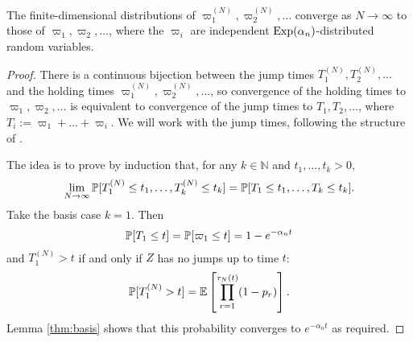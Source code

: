 \begin{lemma}\label{thm:holdingtimes_distn}
The finite-dimensional distributions of $\varpi_1^{(N)} , \varpi_2^{(N)} , \dots$ converge as $N\to\infty$ to those of $\varpi_1, \varpi_2, \dots$, where the $\varpi_i$ are independent $\operatorname{Exp}(\alpha_n)$-distributed random variables.
\end{lemma}

\begin{proof}
There is a continuous bijection between the jump times $T_1^{(N)} ,T_2^{(N)},\dots$ and the holding times $\varpi_1^{(N)}, \varpi_2^{(N)}, \dots$, so convergence of the holding times to $\varpi_1, \varpi_2,\dots$ is equivalent to convergence of the jump times to $T_1, T_2, \dots$, where $T_i := \varpi_1+\dots+\varpi_i$. 
We will work with the jump times, following the structure of \textcite[Lemma 3.2]{mohle1999}.

The idea is to prove by induction that, for any $k\in\mathbb{N}$ and $t_1,\dots,t_k >0$,
\begin{equation}\label{eq:518}
\lim_{N\to\infty} \mathbb{P}[ T_1^{(N)} \leq t_1, \dots , T_k^{(N)} \leq t_k ]
= \mathbb{P}[ T_1 \leq t_1, \dots , T_k \leq t_k ] .
\end{equation}
Take the basis case $k=1$. Then 
\begin{equation*}
\mathbb{P}[ T_1 \leq t ] 
= \mathbb{P}[ \varpi_1 \leq t ] = 1 - e^{-\alpha_n t}
\end{equation*}
and $T_1^{(N)} >t$ if and only if $Z$ has no jumps up to time $t$:
\begin{equation*}
\mathbb{P}[T_1^{(N)} >t] 
= \mathbb{E}\left[ \prod_{r=1}^{\tau_N(t)} (1-p_r) \right] .
\end{equation*}
Lemma \ref{thm:basis} shows that this probability converges to $e^{-\alpha_n t}$ as required.


\end{proof}
